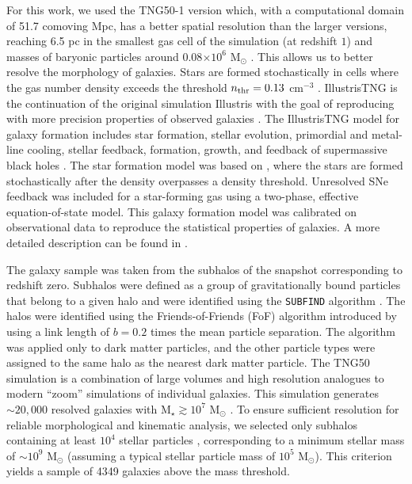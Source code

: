 \documentclass[fleqn,usenatbib]{mnras}
\begin{document}
For this work, we used the TNG50-1 version \citep{Pillepich_2019, Nelson_2019} {which}, {with a computational domain of} 51.7 comoving Mpc, has a better spatial resolution than the larger versions, reaching 6.5 pc in the smallest gas cell of the simulation (at redshift $1$) and masses of baryonic particles around 0.08$\times10^{6}$ M$_\odot$ \citep{Pillepich_2019}. This allows us to better resolve the morphology of galaxies. Stars are formed stochastically in cells where the gas number density exceeds the threshold $n_{\rm thr}=0.13$ cm$^{-3}$ \citep[see][for details]{Vogelsberger_2013}. {IllustrisTNG is the continuation of the original simulation Illustris {\citep{2014_Genel,2014_Vogelsberger}} with the {goal} of reproducing with more precision properties of observed galaxies {\citep{2019a_Nelson}}. The IllustrisTNG model for galaxy formation includes star formation, stellar evolution, primordial and metal-line cooling, stellar feedback, formation, growth, and feedback of supermassive black holes \citep{2017_Weinberger, 2018a_Pillepich}. The star formation model was based on \citet{2003_Springel}, where the stars are formed stochastically after the density overpasses a density threshold. Unresolved SNe feedback was included for a star-forming gas using a two-phase, effective equation-of-state model. This galaxy formation model was calibrated on observational data to reproduce the statistical properties of galaxies. A {more detailed} description can be found in \citet{2018a_Pillepich}. }

The galaxy sample was taken from the subhalos of the snapshot corresponding to redshift zero. Subhalos were defined as a group of gravitationally bound particles that belong to a given halo and were identified using the \texttt{SUBFIND} algorithm \citep{Springel_2001}. The halos were identified using the Friends-of-Friends (FoF) algorithm introduced by \cite{Davis_1985} using a link length of $b=0.2$ times the mean particle separation. The algorithm was applied only to dark matter particles, and the other particle types were assigned to the same halo as the nearest dark matter particle. {The TNG50 {simulation} is a combination of large volumes and high resolution analogues to modern ``zoom'' simulations of individual galaxies. This simulation {generates} $\sim 20,000$ resolved galaxies with M$_\star \gtrsim 10^7$ M$_\odot$ \citep{Nelson_2019}}. 
{To ensure sufficient resolution for reliable morphological and kinematic analysis, we selected only subhalos containing at least $10^4$ stellar particles \citep{Penoyre_2017}, corresponding to a minimum stellar mass of $\sim 10^9$ M$_\odot$ (assuming a typical stellar particle mass of $10^5$ M$_\odot$). This criterion yields a sample of 4349 galaxies above the mass threshold.}
\end{document}
